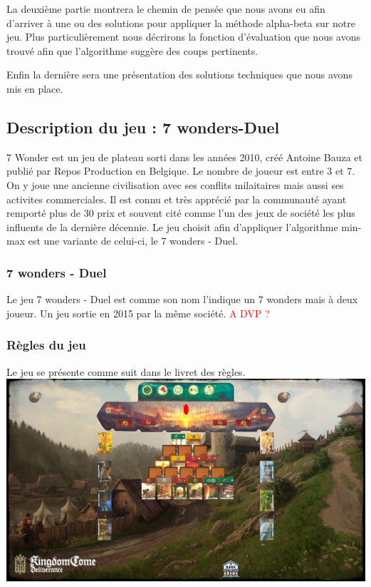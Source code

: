 \documentclass[a4paper, 12pt, french]{article}
\begin{document}
	La deuxième partie montrera le chemin de pensée que nous avons eu afin d'arriver à une ou des solutions pour
	appliquer la méthode alpha-beta sur notre jeu. Plus particulièrement nous décrirons la fonction d'évaluation
	que nous avons trouvé afin que l'algorithme suggère des coups pertinents.

	Enfin la dernière sera une présentation des solutions techniques que nous avons mis en place.

	\subsection{Description du jeu : 7 wonders-Duel}
	7 Wonder est un jeu de plateau sorti dans les années 2010, créé Antoine Bauza et publié par Repos Production en
	Belgique. Le nombre de joueur est entre 3 et 7. On y joue une ancienne
	civilisation avec ses conflits milaitaires mais aussi ses activites commerciales. Il est connu et très apprécié
	par la communauté ayant remporté plus de 30 prix et souvent cité comme l'un des jeux de société les plus influents
	de la dernière décennie\cite{wiki_7_wonder}.
	Le jeu choisit afin d'appliquer l'algorithme min-max est une variante de celui-ci, le 7 wonders - Duel.

	\subsubsection{7 wonders - Duel}
	Le jeu 7 wonders - Duel est comme son nom l'indique un 7 wonders mais à deux joueur. Un jeu sortie en 2015
	par la même société. \textcolor{red}{A DVP ?}

	\subsubsection{Règles du jeu}
	Le jeu se présente comme suit dans le livret des règles\cite{regle_7_wonder_duel}.
	 \\
	 \includegraphics[width=15cm]{images/PlateauDebut.png}
	 \\
\end{document}
